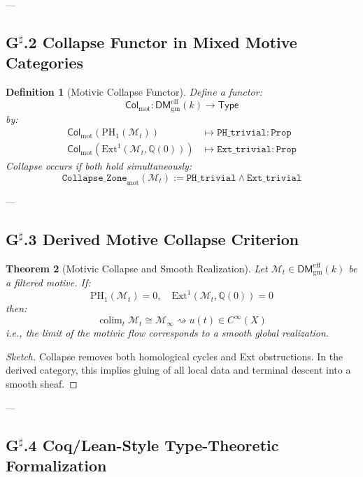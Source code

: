 \documentclass[11pt]{article}
\DeclareMathOperator{\colim}{colim}
\newtheorem{theorem}{Theorem}[section]
\newtheorem{definition}[theorem]{Definition}
\begin{document}
---

\subsection*{G$^\sharp$.2 Collapse Functor in Mixed Motive Categories}

\begin{definition}[Motivic Collapse Functor]
Define a functor:
\[
\mathsf{Col}_{\mathrm{mot}}: \mathsf{DM}^{\mathrm{eff}}_{\mathrm{gm}}(k) \longrightarrow \mathsf{Type}
\]
by:
\[
\begin{aligned}
\mathsf{Col}_{\mathrm{mot}}(\mathrm{PH}_1(\mathcal{M}_t)) &\mapsto \texttt{PH\_trivial} : \texttt{Prop} \\
\mathsf{Col}_{\mathrm{mot}}(\mathrm{Ext}^1(\mathcal{M}_t, \mathbb{Q}(0))) &\mapsto \texttt{Ext\_trivial} : \texttt{Prop}
\end{aligned}
\]
Collapse occurs if both hold simultaneously:
\[
\texttt{Collapse\_Zone}_{\mathrm{mot}}(\mathcal{M}_t) := \texttt{PH\_trivial} \land \texttt{Ext\_trivial}
\]
\end{definition}

---

\subsection*{G$^\sharp$.3 Derived Motive Collapse Criterion}

\begin{theorem}[Motivic Collapse and Smooth Realization]
Let \( \mathcal{M}_t \in \mathsf{DM}^{\mathrm{eff}}_{\mathrm{gm}}(k) \) be a filtered motive.  
If:
\[
\mathrm{PH}_1(\mathcal{M}_t) = 0, \quad \mathrm{Ext}^1(\mathcal{M}_t, \mathbb{Q}(0)) = 0
\]
then:
\[
\colim_t \mathcal{M}_t \cong \mathcal{M}_\infty \rightsquigarrow u(t) \in C^\infty(X)
\]
i.e., the limit of the motivic flow corresponds to a smooth global realization.
\end{theorem}

\begin{proof}[Sketch]
Collapse removes both homological cycles and Ext obstructions.  
In the derived category, this implies gluing of all local data and terminal descent into a smooth sheaf.
\end{proof}

---

\subsection*{G$^\sharp$.4 Coq/Lean-Style Type-Theoretic Formalization}
\end{document}
